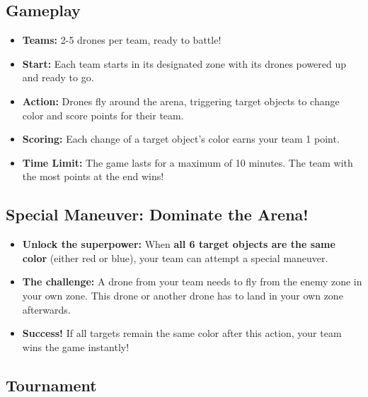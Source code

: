 \subsection{Gameplay}

\begin{itemize}
\item \textbf{Teams:} 2-5 drones per team, ready to battle!
\item \textbf{Start:} Each team starts in its designated zone with its drones powered up and ready to go.
\item \textbf{Action:} Drones fly around the arena, triggering target objects to change color and score points for their team.
\item \textbf{Scoring:} Each change of a target object's color earns your team 1 point.
\item \textbf{Time Limit:} The game lasts for a maximum of 10 minutes. The team with the most points at the end wins!
\end{itemize}


\subsection{Special Maneuver: Dominate the Arena!}

\begin{itemize}
\item \textbf{Unlock the superpower:} When \textbf{all 6 target objects are the same color} (either red or blue), your team can attempt a special maneuver.
\item \textbf{The challenge:} A drone from your team needs to fly from the enemy zone in your own zone. This drone or another drone has to land in your own zone afterwards.
\item \textbf{Success!} If all targets remain the same color after this action, your team wins the game instantly!
\end{itemize}

\subsection{Tournament}

